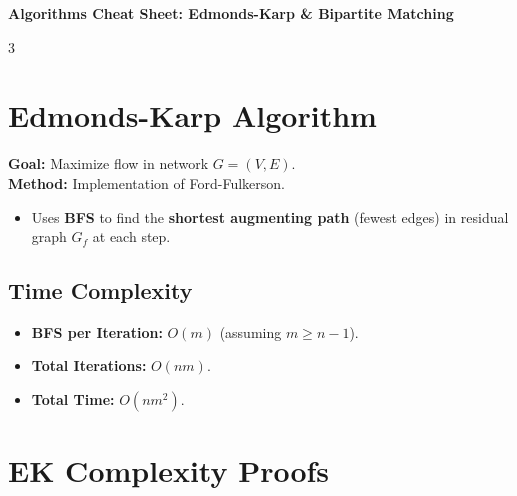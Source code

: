 \documentclass[a4paper,10pt]{article}
\begin{document}
\begin{center}
    {\Large \textbf{Algorithms Cheat Sheet: Edmonds-Karp \& Bipartite Matching}}
\end{center}

\begin{multicols}{3}

\section{Edmonds-Karp Algorithm}
\textbf{Goal:} Maximize flow in network $G=(V,E)$. \\
\textbf{Method:} Implementation of Ford-Fulkerson.
\begin{itemize}
    \item Uses \textbf{BFS} to find the \textbf{shortest augmenting path} (fewest edges) in residual graph $G_f$ at each step.
\end{itemize}

\subsection{Time Complexity}
\begin{itemize}
    \item \textbf{BFS per Iteration:} $O(m)$ (assuming $m \ge n-1$).
    \item \textbf{Total Iterations:} $O(nm)$.
    \item \textbf{Total Time:} $O(nm^2)$.
\end{itemize}

\section{EK Complexity Proofs}


\end{multicols}
\end{document}
